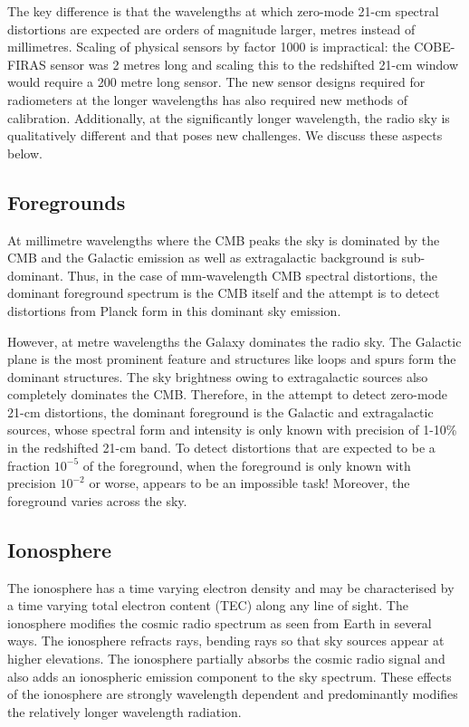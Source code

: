 The key difference is that the wavelengths at which zero-mode 21-cm spectral distortions are expected are orders of magnitude larger, metres instead of millimetres.  Scaling of physical sensors by factor 1000 is impractical: the COBE-FIRAS sensor was 2 metres long and scaling this to the redshifted 21-cm window would require a 200 metre long sensor.  The new sensor designs required for radiometers at the longer wavelengths has also required new methods of calibration.  Additionally, at the significantly longer wavelength, the radio sky is qualitatively different and that poses new challenges.  We discuss these aspects below.

\subsection{Foregrounds}

At millimetre wavelengths where the CMB peaks the sky is dominated by the CMB and the Galactic emission as well as extragalactic background is sub-dominant. Thus, in the case of mm-wavelength CMB spectral distortions, the dominant foreground spectrum is the CMB itself and the attempt is to detect distortions from Planck form in this dominant sky emission.

However, at metre wavelengths the Galaxy dominates the radio sky.  The Galactic plane is the most prominent feature and structures like loops and spurs form the dominant structures.  The sky brightness owing to extragalactic sources also completely dominates the CMB. Therefore, in the attempt to detect zero-mode 21-cm distortions, the dominant foreground is the Galactic and extragalactic sources, whose spectral form and intensity is only known with precision of 1-10\% in the redshifted 21-cm band.   To detect distortions that are expected to be a fraction $10^{-5}$ of the foreground, when the foreground is only known with precision $10^{-2}$ or worse, appears to be an impossible task!  Moreover, the foreground varies across the sky.

\subsection{Ionosphere}

The ionosphere has a time varying electron density and may be characterised by a time varying total electron content (TEC) along any line of sight.  The ionosphere modifies the cosmic radio spectrum as seen from Earth in several ways. The ionosphere refracts rays, bending rays so that sky sources appear at higher elevations.  The ionosphere partially absorbs the cosmic radio signal and also adds an ionospheric emission component to the sky spectrum. These effects of the ionosphere are strongly wavelength dependent and predominantly modifies the relatively longer wavelength radiation.  

